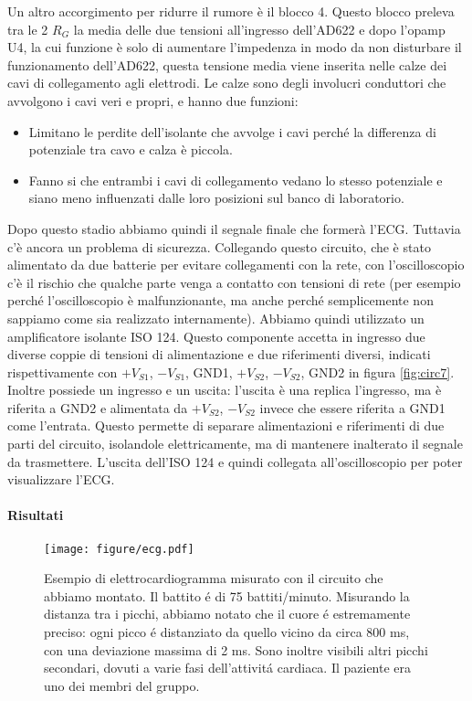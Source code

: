 Un altro accorgimento per ridurre il rumore è il blocco 4. Questo blocco preleva tra le 2 $R_G$ la media
delle due tensioni all'ingresso dell'AD622 e dopo l'opamp U4, la cui funzione è solo di
aumentare l'impedenza in modo da non disturbare il funzionamento dell'AD622, questa tensione media viene
inserita nelle calze dei cavi di collegamento agli elettrodi. Le calze sono degli involucri conduttori che avvolgono i
cavi veri e propri, e hanno due funzioni:

\begin{itemize}
    \item{Limitano le perdite dell'isolante che avvolge i cavi perché la differenza di potenziale tra cavo e calza è
        piccola.}
    \item{Fanno si che entrambi i cavi di collegamento vedano lo stesso potenziale e siano meno influenzati dalle loro
        posizioni sul banco di laboratorio.}
\end{itemize}

Dopo questo stadio abbiamo quindi il segnale finale che formerà l'ECG. Tuttavia c'è ancora un problema
di sicurezza. Collegando questo circuito, che è stato alimentato da due batterie
per evitare collegamenti con la rete, con l'oscilloscopio c'è il rischio che qualche parte venga
a contatto con tensioni di rete (per esempio perché l'oscilloscopio è malfunzionante, ma anche perché
semplicemente non sappiamo come sia realizzato internamente). Abbiamo quindi utilizzato un amplificatore
isolante ISO 124. Questo componente accetta in ingresso due diverse coppie di tensioni di alimentazione e due
riferimenti diversi, indicati rispettivamente con $+V_{S1}$, $-V_{S1}$, GND1, $+V_{S2}$, $-V_{S2}$, GND2 in
figura \ref{fig:circ7}.
Inoltre possiede un ingresso e un uscita: l'uscita è una replica l'ingresso, ma è riferita a GND2 e alimentata
da $+V_{S2}$, $-V_{S2}$ invece che essere riferita a GND1 come l'entrata. Questo permette di separare
alimentazioni e riferimenti di due parti del circuito, isolandole elettricamente, ma di mantenere inalterato il segnale
da trasmettere. L'uscita dell'ISO 124 e quindi collegata all'oscilloscopio per poter visualizzare l'ECG.

\paragraph{Risultati}

\begin{SCfigure*}[][p]
    \texttt{[image: figure/ecg.pdf]}
    \caption{Esempio di elettrocardiogramma misurato con il circuito che abbiamo montato.
        Il battito é di 75 battiti/minuto. Misurando la distanza tra i picchi,
        abbiamo notato che il cuore é estremamente preciso: ogni picco é distanziato da quello
        vicino da circa 800 ms, con una deviazione massima di 2 ms. Sono inoltre visibili altri
        picchi secondari, dovuti a varie fasi dell'attivitá cardiaca. Il paziente era uno dei
        membri del gruppo.}
    \label{fig:ecg7}
\end{SCfigure*}

